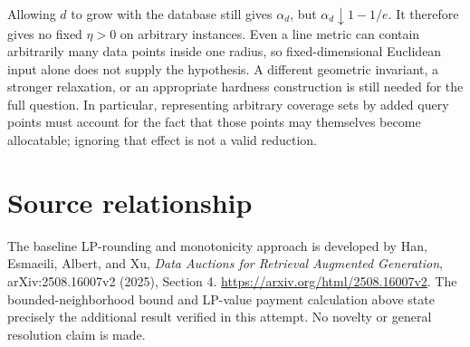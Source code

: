 \documentclass[11pt]{article}
\begin{document}
Allowing $d$ to grow with the database still gives $\alpha_d$, but
$\alpha_d\downarrow1-1/e$. It therefore gives no fixed $\eta>0$ on arbitrary
instances. Even a line metric can contain arbitrarily many data points
inside one radius, so fixed-dimensional Euclidean input alone does not
supply the hypothesis. A different geometric invariant, a stronger
relaxation, or an appropriate hardness construction is still needed for
the full question. In particular, representing arbitrary coverage sets
by added query points must account for the fact that those points may
themselves become allocatable; ignoring that effect is not a valid reduction.

\section*{Source relationship}
The baseline LP-rounding and monotonicity approach is developed by Han,
Esmaeili, Albert, and Xu, \emph{Data Auctions for Retrieval Augmented Generation}, arXiv:2508.16007v2 (2025), Section 4.
\url{https://arxiv.org/html/2508.16007v2}.
The bounded-neighborhood bound and LP-value payment calculation above
state precisely the additional result verified in this attempt. No novelty
or general resolution claim is made.
\end{document}
